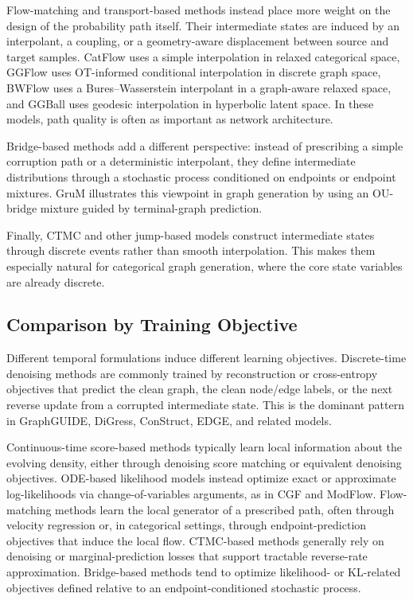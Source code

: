 \documentclass{article}
\begin{document}
Flow-matching and transport-based methods instead place more weight on the design of the probability path itself. Their intermediate states are induced by an interpolant, a coupling, or a geometry-aware displacement between source and target samples. CatFlow uses a simple interpolation in relaxed categorical space, GGFlow uses OT-informed conditional interpolation in discrete graph space, BWFlow uses a Bures--Wasserstein interpolant in a graph-aware relaxed space, and GGBall uses geodesic interpolation in hyperbolic latent space. In these models, path quality is often as important as network architecture.

Bridge-based methods add a different perspective: instead of prescribing a simple corruption path or a deterministic interpolant, they define intermediate distributions through a stochastic process conditioned on endpoints or endpoint mixtures. GruM illustrates this viewpoint in graph generation by using an OU-bridge mixture guided by terminal-graph prediction.

Finally, CTMC and other jump-based models construct intermediate states through discrete events rather than smooth interpolation. This makes them especially natural for categorical graph generation, where the core state variables are already discrete.


\subsection{Comparison by Training Objective}
\label{sec:compare_training}


Different temporal formulations induce different learning objectives. Discrete-time denoising methods are commonly trained by reconstruction or cross-entropy objectives that predict the clean graph, the clean node/edge labels, or the next reverse update from a corrupted intermediate state. This is the dominant pattern in GraphGUIDE, DiGress, ConStruct, EDGE, and related models.

Continuous-time score-based methods typically learn local information about the evolving density, either through denoising score matching or equivalent denoising objectives. ODE-based likelihood models instead optimize exact or approximate log-likelihoods via change-of-variables arguments, as in CGF and ModFlow. Flow-matching methods learn the local generator of a prescribed path, often through velocity regression or, in categorical settings, through endpoint-prediction objectives that induce the local flow. CTMC-based methods generally rely on denoising or marginal-prediction losses that support tractable reverse-rate approximation. Bridge-based methods tend to optimize likelihood- or KL-related objectives defined relative to an endpoint-conditioned stochastic process.
\end{document}
